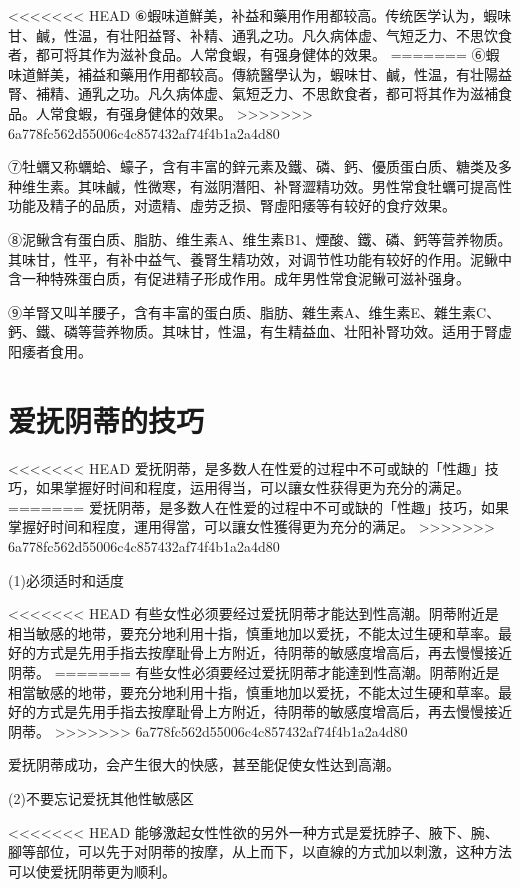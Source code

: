 \documentclass[12pt,UTF8]{ctexbook}
\begin{document}
<<<<<<< HEAD
⑥蝦味道鮮美，补益和藥用作用都较高。传统医学认为，蝦味甘、鹹，性温，有壮阳益腎、补精、通乳之功。凡久病体虚、气短乏力、不思饮食者，都可将其作为滋补食品。人常食蝦，有强身健体的效果。
=======
⑥蝦味道鮮美，補益和藥用作用都较高。傳統醫學认为，蝦味甘、鹹，性温，有壮陽益腎、補精、通乳之功。凡久病体虚、氣短乏力、不思飲食者，都可将其作为滋補食品。人常食蝦，有强身健体的效果。
>>>>>>> 6a778fc562d55006c4c857432af74f4b1a2a4d80

⑦牡蠣又称蠣蛤、蠔子，含有丰富的鋅元素及鐵、磷、鈣、優质蛋白质、糖类及多种维生素。其味鹹，性微寒，有滋阴潛阳、补腎澀精功效。男性常食牡蠣可提高性功能及精子的品质，对遗精、虛劳乏损、腎虛阳痿等有较好的食疗效果。

⑧泥鳅含有蛋白质、脂肪、维生素A、维生素B1、煙酸、鐵、磷、鈣等营养物质。其味甘，性平，有补中益气、養腎生精功效，对调节性功能有较好的作用。泥鳅中含一种特殊蛋白质，有促进精子形成作用。成年男性常食泥鳅可滋补强身。

⑨羊腎又叫羊腰子，含有丰富的蛋白质、脂肪、雜生素A、维生素E、雜生素C、鈣、鐵、磷等营养物质。其味甘，性温，有生精益血、壮阳补腎功效。适用于腎虚阳痿者食用。

\section{爱抚阴蒂的技巧}

<<<<<<< HEAD
爱抚阴蒂，是多数人在性爱的过程中不可或缺的「性趣」技巧，如果掌握好时间和程度，运用得当，可以讓女性获得更为充分的满足。
=======
爱抚阴蒂，是多数人在性爱的过程中不可或缺的「性趣」技巧，如果掌握好时间和程度，運用得當，可以讓女性獲得更为充分的满足。
>>>>>>> 6a778fc562d55006c4c857432af74f4b1a2a4d80

(1)必须适时和适度

<<<<<<< HEAD
有些女性必须要经过爱抚阴蒂才能达到性高潮。阴蒂附近是相当敏感的地带，要充分地利用十指，慎重地加以爱抚，不能太过生硬和草率。最好的方式是先用手指去按摩耻骨上方附近，待阴蒂的敏感度增高后，再去慢慢接近阴蒂。
=======
有些女性必須要经过爱抚阴蒂才能達到性高潮。阴蒂附近是相當敏感的地带，要充分地利用十指，慎重地加以爱抚，不能太过生硬和草率。最好的方式是先用手指去按摩耻骨上方附近，待阴蒂的敏感度增高后，再去慢慢接近阴蒂。
>>>>>>> 6a778fc562d55006c4c857432af74f4b1a2a4d80

爱抚阴蒂成功，会产生很大的快感，甚至能促使女性达到高潮。

(2)不要忘记爱抚其他性敏感区

<<<<<<< HEAD
能够激起女性性欲的另外一种方式是爱抚脖子、腋下、腕、腳等部位，可以先于对阴蒂的按摩，从上而下，以直線的方式加以刺激，这种方法可以使爱抚阴蒂更为顺利。
\end{document}
